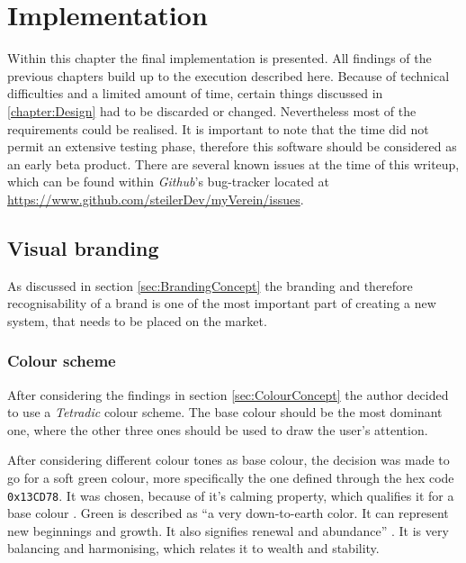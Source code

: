 \chapter{Implementation}
\label{chapter:Implementation}
Within this chapter the final implementation is presented. All findings of the previous chapters build up to the execution described here. Because of technical difficulties and a limited amount of time, certain things discussed in \vref{chapter:Design} had to be discarded or changed. Nevertheless most of the requirements could be realised. It is important to note that the time did not permit an extensive testing phase, therefore this software should be considered as an early beta product. There are several known issues at the time of this writeup, which can be found within \emph{Github}'s bug-tracker located at \url{https://www.github.com/steilerDev/myVerein/issues}.

\section{Visual branding}
\label{sec:BrandingImplementation}
As discussed in section \vref{sec:BrandingConcept} the branding and therefore recognisability of a brand is one of the most important part of creating a new system, that needs to be placed on the market. 

\subsection{Colour scheme}
After considering the findings in section \vref{sec:ColourConcept} the author decided to use a \emph{Tetradic} colour scheme. The base colour should be the most dominant one, where the other three ones should be used to draw the user's attention. 

After considering different colour tones as base colour, the decision was made to go for a soft green colour, more specifically the one defined through the hex code \texttt{0x13CD78}. It was chosen, because of it's calming property, which qualifies it for a base colour \cite{Chapman:2010aa}. Green is described as \enquote{a very down-to-earth color. It can represent new beginnings and growth. It also signifies renewal and abundance} \cite{Chapman:2010aa}. It is very balancing and harmonising, which relates it to wealth and stability. 

